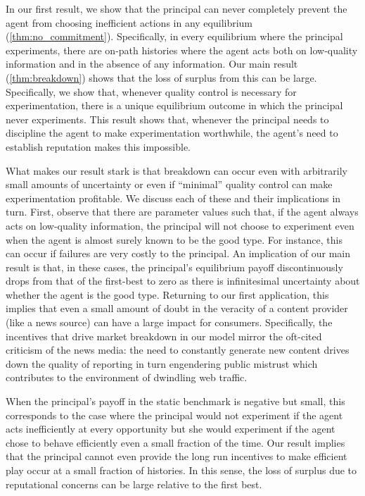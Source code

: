 \documentclass[11pt,reqno]{amsart}
\begin{document}
In our first result, we show that the principal can never completely prevent the agent from choosing inefficient actions in any equilibrium (\cref{thm:no_commitment}). Specifically, in every equilibrium where the principal experiments, there are on-path histories where the agent acts both on low-quality information and in the absence of any information. Our main result (\cref{thm:breakdown}) shows that the loss of surplus from this can be large. Specifically, we show that, whenever quality control is necessary for experimentation, there is a unique equilibrium outcome in which the principal never experiments. This result shows that, whenever the principal needs to discipline the agent to make experimentation worthwhile, the agent's need to establish reputation makes this impossible.

What makes our result stark is that breakdown can occur even with arbitrarily small amounts of uncertainty or even if ``minimal'' quality control can make experimentation profitable. We discuss each of these and their implications in turn. First, observe that there are parameter values such that, if the agent always acts on low-quality information, the principal will not choose to experiment even when the agent is almost surely known to be the good type. For instance, this can occur if failures are very costly to the principal. An implication of our main result is that, in these cases, the principal's equilibrium payoff discontinuously drops from that of the first-best to zero as there is infinitesimal uncertainty about whether the agent is the good type. Returning to our first application, this implies that even a small amount of doubt in the veracity of a content provider (like a news source) can have a large impact for consumers. Specifically, the incentives that drive market breakdown in our model mirror the oft-cited criticism of the news media: the need to constantly generate new content drives down the quality of reporting in turn engendering public mistrust which contributes to the environment of dwindling web traffic.

When the principal's payoff in the static benchmark is negative but small, this corresponds to the case where the principal would not experiment if the agent acts inefficiently at every opportunity but she would experiment if the agent chose to behave efficiently even a small fraction of the time. Our result implies that the principal cannot even provide the long run incentives to make efficient play occur at a small fraction of histories. In this sense, the loss of surplus due to reputational concerns can be large relative to the first best.
\end{document}
